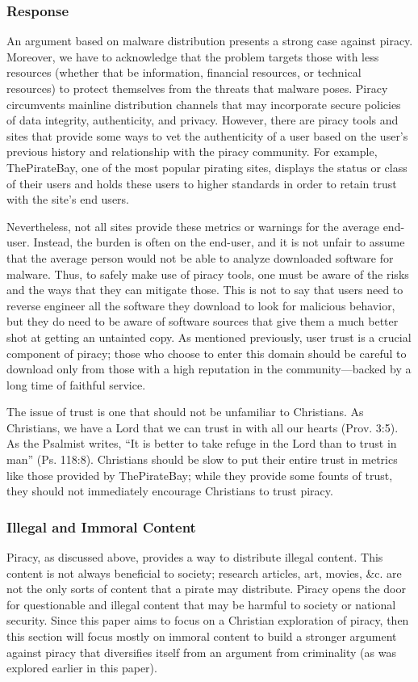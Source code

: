 \documentclass[onecolumn, 12pt]{article}
\begin{document}
\subsubsection{Response}
An argument based on malware distribution presents a strong case against piracy.
Moreover, we have to acknowledge that the problem targets those with less
resources (whether that be information, financial resources, or technical
resources) to protect themselves from the threats that malware poses. Piracy
circumvents mainline distribution channels that may incorporate secure policies
of data integrity, authenticity, and privacy. However, there are piracy tools
and sites that provide some ways to vet the authenticity of a user based on the
user's previous history and relationship with the piracy community. For example,
ThePirateBay, one of the most popular pirating sites, displays the status or
class of their users and holds these users to higher standards in order to
retain trust with the site's end users.~\cite{suprbay:status}

Nevertheless, not all sites provide these metrics or warnings for the average
end-user. Instead, the burden is often on the end-user, and it is not unfair to
assume that the average person would not be able to analyze downloaded software
for malware. Thus, to safely make use of piracy tools, one must be aware of the
risks and the ways that they can mitigate those. This is not to say that users
need to reverse engineer all the software they download to look for malicious
behavior, but they do need to be aware of software sources that give them a
much better shot at getting an untainted copy. As mentioned previously, user
trust is a crucial component of piracy; those who choose to enter this domain
should be careful to download only from those with a high reputation in the
community---backed by a long time of faithful service.

The issue of trust is one that should not be unfamiliar to Christians. As
Christians, we have a Lord that we can trust in with all our hearts (Prov. 3:5).
As the Psalmist writes, \enquote{It is better to take refuge in the Lord than
to trust in man} (Ps. 118:8). Christians should be slow to put their entire
trust in metrics like those provided by ThePirateBay; while they provide some
founts of trust, they should not immediately encourage Christians to trust
piracy.

\subsubsection{Illegal and Immoral Content}
Piracy, as discussed above, provides a way to distribute illegal content. This
content is not always beneficial to society; research articles, art, movies, \&c.
are not the only sorts of content that a pirate may distribute. Piracy opens
the door for questionable and illegal content that may be harmful to society
or national security. Since this paper aims to focus on a Christian exploration
of piracy, then this section will focus mostly on immoral content to build a
stronger argument against piracy that diversifies itself from an argument from
criminality (as was explored earlier in this paper).
\end{document}
